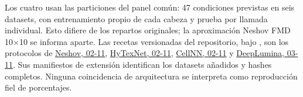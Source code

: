 Los cuatro usan las particiones del panel común: 47 condiciones previstas en seis datasets, con entrenamiento propio de cada cabeza y prueba por llamada individual. Esto difiere de los repartos originales; la aproximación Neshov FMD 10\(\times\)10 se informa aparte. Las recetas versionadas del repositorio, bajo , son los protocolos de \href{https://github.com/Joafp/concatenacion-descriptores-texturas/blob/main/docs/fsc_tex/PROTOCOLO_NESHOV_PANEL_COMUN_2026-11-02.md}{Neshov, 02-11}, \href{https://github.com/Joafp/concatenacion-descriptores-texturas/blob/main/docs/fsc_tex/PROTOCOLO_HYTEX_ADAPTACION_FMD_2026-11-02.md}{HyTexNet, 02-11}, \href{https://github.com/Joafp/concatenacion-descriptores-texturas/blob/main/docs/fsc_tex/PROTOCOLO_CELLNN_ADAPTACION_FMD_2026-11-02.md}{CellNN, 02-11} y \href{https://github.com/Joafp/concatenacion-descriptores-texturas/blob/main/docs/fsc_tex/PROTOCOLO_DEEPLUMINA_ADAPTACION_FMD_2026-11-03.md}{DeepLumina, 03-11}. Sus manifiestos de extensión identifican los datasets añadidos y hashes completos. Ninguna coincidencia de arquitectura se interpreta como reproducción fiel de porcentajes.
